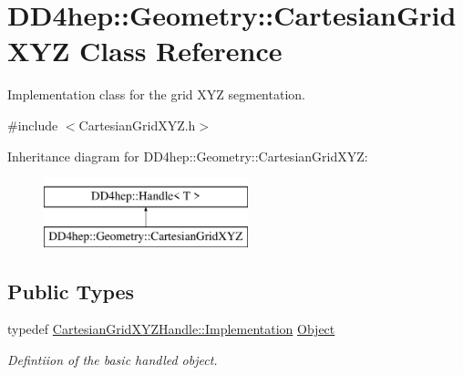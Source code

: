 \hypertarget{class_d_d4hep_1_1_geometry_1_1_cartesian_grid_x_y_z}{}\section{D\+D4hep\+:\+:Geometry\+:\+:Cartesian\+Grid\+X\+YZ Class Reference}
\label{class_d_d4hep_1_1_geometry_1_1_cartesian_grid_x_y_z}


Implementation class for the grid X\+YZ segmentation.  




{\ttfamily \#include $<$Cartesian\+Grid\+X\+Y\+Z.\+h$>$}

Inheritance diagram for D\+D4hep\+:\+:Geometry\+:\+:Cartesian\+Grid\+X\+YZ\+:\begin{figure}[H]
\begin{center}
\leavevmode
\includegraphics[height=2.000000cm]{class_d_d4hep_1_1_geometry_1_1_cartesian_grid_x_y_z}
\end{center}
\end{figure}
\subsection*{Public Types}
\begin{DoxyCompactItemize}
\item 
typedef \hyperlink{class_d_d4hep_1_1_handle_ad7ff728a25806079516b8965b9113f1a}{Cartesian\+Grid\+X\+Y\+Z\+Handle\+::\+Implementation} \hyperlink{class_d_d4hep_1_1_geometry_1_1_cartesian_grid_x_y_z_a14399d469a4ddf78e0df3e14276a3e4e}{Object}
\begin{DoxyCompactList}\small\item\em Defintiion of the basic handled object. \end{DoxyCompactList}\end{DoxyCompactItemize}
